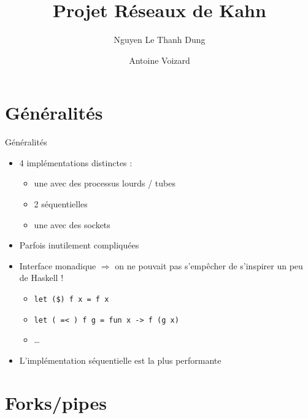\documentclass[xetex]{beamer}
\title{Projet Réseaux de Kahn}
\author[Nguyen, Voizard]{Nguyen Le Thanh Dung \and Antoine Voizard}
\institute[ENS]{\'Ecole Normale Supérieure}
\begin{document}
\begin{frame}
  \titlepage
\end{frame}


\section{Généralités}

\begin{frame}{Généralités}
  \begin{itemize}
  \item 4 implémentations distinctes :
    \begin{itemize}
    \item une avec des processus lourds / tubes
    \item 2 séquentielles
    \item une avec des sockets
    \end{itemize}
  \item Parfois inutilement compliquées
  \item Interface monadique $\Rightarrow$ on ne pouvait pas s'empêcher
    de s'inspirer un peu de Haskell !
    \begin{itemize}
    \item \texttt{let (\$) f x = f x}
    \item \texttt{let ( =< ) f g = fun x -> f (g x)}
    \item \ldots
    \end{itemize}
  \item L'implémentation séquentielle est la plus performante
  \end{itemize}
\end{frame}

\section{Forks/pipes}

\begin{frame}[c]
  \begin{center}
    \Huge \insertsection
  \end{center}
\end{frame}
\end{document}
